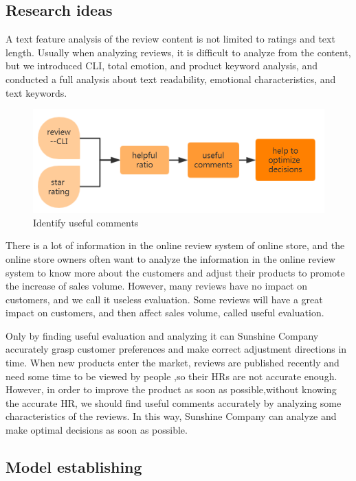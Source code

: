 \documentclass[12pt,a4paper,]{article}
\begin{document}
\hypertarget{research-ideas-1}{%
\subsection{Research ideas}\label{research-ideas-1}}

A text feature analysis of the review content is not limited to ratings
and text length. Usually when analyzing reviews, it is difficult to
analyze from the content, but we introduced CLI, total emotion, and
product keyword analysis, and conducted a full analysis about text
readability, emotional characteristics, and text keywords.

\begin{figure}

{\centering \includegraphics[width=0.6\linewidth]{fig1} 

}

\caption{Identify useful comments}\label{fig:unnamed-chunk-11}
\end{figure}

There is a lot of information in the online review system of online
store, and the online store owners often want to analyze the information
in the online review system to know more about the customers and adjust
their products to promote the increase of sales volume. However, many
reviews have no impact on customers, and we call it useless evaluation.
Some reviews will have a great impact on customers, and then affect
sales volume, called useful evaluation.

Only by finding useful evaluation and analyzing it can Sunshine Company
accurately grasp customer preferences and make correct adjustment
directions in time. When new products enter the market, reviews are
published recently and need some time to be viewed by people ,so their
HRs are not accurate enough. However, in order to improve the product as
soon as possible,without knowing the accurate HR, we should find useful
comments accurately by analyzing some characteristics of the reviews. In
this way, Sunshine Company can analyze and make optimal decisions as
soon as possible.

\hypertarget{model-establishing}{%
\subsection{Model establishing}\label{model-establishing}}
\end{document}
